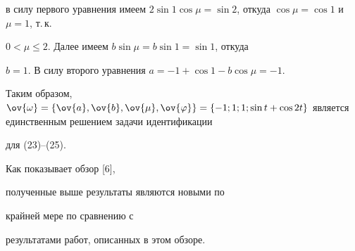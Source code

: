 \begin{exam}
в силу первого уравнения имеем $2\sin 1


\cos\mu = \sin 2$, откуда $\cos\mu = \cos 1$ и $\mu =1$, т.\,к.


$0<\mu\leq 2$. Далее имеем $b\sin\mu = b\sin 1 = \sin 1$, откуда


$b=1$. В силу второго уравнения $a= -1+ \cos 1 - b\cos\mu = -1$.


Таким образом, $\ov{\omega}=


\{\ov{a},\ov{b},\ov{\mu},\ov{\varphi}\} = \{ -1;1;1; \sin t +


\cos 2t\}$ является единственным решением задачи идентификации


для (23)--(25).


\end{exam}





\begin{note}


Как показывает обзор [6],


полученные выше результаты являются новыми по


крайней мере по сравнению с


результатами работ, описанных в этом обзоре.


\end{note}








